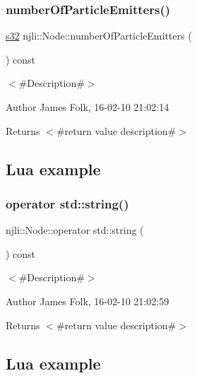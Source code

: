 \subsubsection{\texorpdfstring{number\+Of\+Particle\+Emitters()}{numberOfParticleEmitters()}}
{\footnotesize\ttfamily \mbox{\hyperlink{_util_8h_aa62c75d314a0d1f37f79c4b73b2292e2}{s32}} njli\+::\+Node\+::number\+Of\+Particle\+Emitters (\begin{DoxyParamCaption}{ }\end{DoxyParamCaption}) const}



$<$\#\+Description\#$>$ 

\begin{DoxyAuthor}{Author}
James Folk, 16-\/02-\/10 21\+:02\+:14
\end{DoxyAuthor}
\begin{DoxyReturn}{Returns}
$<$\#return value description\#$>$
\end{DoxyReturn}
\hypertarget{classnjli_1_1_steering_behavior_wander_ex1}{}\subsection{Lua example}\label{classnjli_1_1_steering_behavior_wander_ex1}

\begin{DoxyCodeInclude}
\end{DoxyCodeInclude}
\mbox{\label{classnjli_1_1_node_a4cbf1484792e7d582bb2722325ba0ece}} 
\subsubsection{\texorpdfstring{operator std\+::string()}{operator std::string()}}
{\footnotesize\ttfamily njli\+::\+Node\+::operator std\+::string (\begin{DoxyParamCaption}{ }\end{DoxyParamCaption}) const\hspace{0.3cm}{\ttfamily [virtual]}}



$<$\#\+Description\#$>$ 

\begin{DoxyAuthor}{Author}
James Folk, 16-\/02-\/10 21\+:02\+:59
\end{DoxyAuthor}
\begin{DoxyReturn}{Returns}
$<$\#return value description\#$>$
\end{DoxyReturn}
\hypertarget{classnjli_1_1_steering_behavior_wander_ex1}{}\subsection{Lua example}\label{classnjli_1_1_steering_behavior_wander_ex1}


